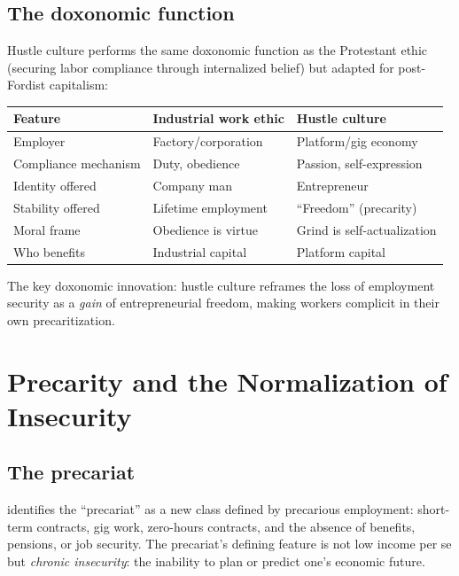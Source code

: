 \subsection{The doxonomic function}

\begin{proposition}
\label{prop:hustle-discipline}
Hustle culture performs the same doxonomic function as the Protestant ethic (securing labor compliance through internalized belief) but adapted for post-Fordist capitalism:
\begin{center}
\begin{tabular}{lll}
\toprule
Feature & Industrial work ethic & Hustle culture \\
\midrule
Employer & Factory/corporation & Platform/gig economy \\
Compliance mechanism & Duty, obedience & Passion, self-expression \\
Identity offered & Company man & Entrepreneur \\
Stability offered & Lifetime employment & ``Freedom'' (precarity) \\
Moral frame & Obedience is virtue & Grind is self-actualization \\
Who benefits & Industrial capital & Platform capital \\
\bottomrule
\end{tabular}
\end{center}
The key doxonomic innovation: hustle culture reframes the loss of employment security as a \emph{gain} of entrepreneurial freedom, making workers complicit in their own precaritization.
\end{proposition}

\section{Precarity and the Normalization of Insecurity}
\label{sec:ch26-precarity}

\subsection{The precariat}

\textcite{standing2011} identifies the ``precariat'' as a new class defined by precarious employment: short-term contracts, gig work, zero-hours contracts, and the absence of benefits, pensions, or job security.
The precariat's defining feature is not low income per se but \emph{chronic insecurity}: the inability to plan or predict one's economic future.

